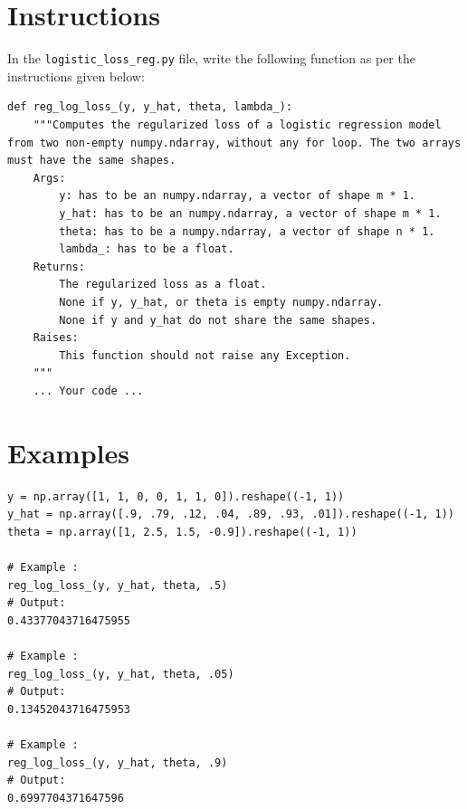 \documentclass{42-en}
\begin{document}
\section*{Instructions}
In the \texttt{logistic\_loss\_reg.py} file, write the following function as per the instructions given below:

\begin{verbatim}
def reg_log_loss_(y, y_hat, theta, lambda_):
	"""Computes the regularized loss of a logistic regression model from two non-empty numpy.ndarray, without any for loop. The two arrays must have the same shapes.
	Args:
		y: has to be an numpy.ndarray, a vector of shape m * 1.
		y_hat: has to be an numpy.ndarray, a vector of shape m * 1.
		theta: has to be a numpy.ndarray, a vector of shape n * 1.
		lambda_: has to be a float.
	Returns:
		The regularized loss as a float.
		None if y, y_hat, or theta is empty numpy.ndarray.
		None if y and y_hat do not share the same shapes.
	Raises:
		This function should not raise any Exception.
	"""
	... Your code ...
\end{verbatim}



\section*{Examples}
\begin{verbatim}
y = np.array([1, 1, 0, 0, 1, 1, 0]).reshape((-1, 1))
y_hat = np.array([.9, .79, .12, .04, .89, .93, .01]).reshape((-1, 1))
theta = np.array([1, 2.5, 1.5, -0.9]).reshape((-1, 1))

# Example :
reg_log_loss_(y, y_hat, theta, .5)
# Output:
0.43377043716475955

# Example :
reg_log_loss_(y, y_hat, theta, .05)
# Output:
0.13452043716475953

# Example :
reg_log_loss_(y, y_hat, theta, .9)
# Output:
0.6997704371647596
\end{verbatim}


\newpage
\end{document}
